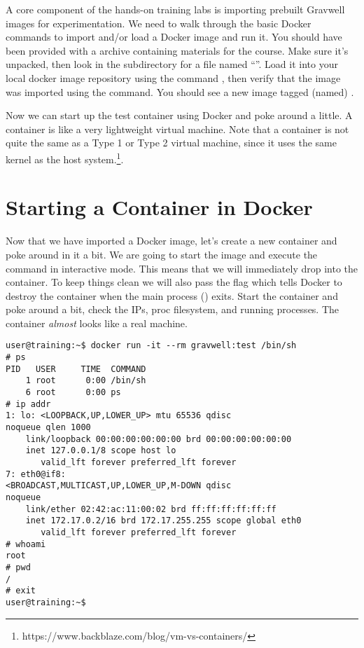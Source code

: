 A core component of the hands-on training labs is importing prebuilt
Gravwell images for experimentation. We need to walk through the basic
Docker commands to import and/or load a Docker image and run it. You
should have been provided with a  archive containing materials for
the course. Make sure it's unpacked, then look in the
 subdirectory for a file named ``''. Load it
into your local docker image repository using the command , then verify that the image was imported using the
 command. You should see a new image tagged (named) .

Now we can start up the test container using Docker and poke around a
little. A container is like a very lightweight virtual machine. Note that a
container is not quite the same as a Type 1 or Type 2 virtual machine,
since it uses the same kernel as the host system.\footnote{https://www.backblaze.com/blog/vm-vs-containers/}.

\section{Starting a Container in Docker}

Now that we have imported a Docker image, let's create a new container
and poke around in it a bit. We are going to start the
 image and execute the  command in
interactive mode. This means that we will immediately drop into the
container. To keep things clean we will also pass the
 flag which tells Docker to destroy the container when the
main process () exits. Start the container and poke around a
bit, check the IPs, proc filesystem, and running processes. The
container \emph{almost} looks like a real machine.

\begin{Verbatim}[breaklines=true]
user@training:~$ docker run -it --rm gravwell:test /bin/sh
# ps
PID   USER     TIME  COMMAND
    1 root      0:00 /bin/sh
    6 root      0:00 ps
# ip addr
1: lo: <LOOPBACK,UP,LOWER_UP> mtu 65536 qdisc
noqueue qlen 1000
    link/loopback 00:00:00:00:00:00 brd 00:00:00:00:00:00
    inet 127.0.0.1/8 scope host lo
       valid_lft forever preferred_lft forever
7: eth0@if8:
<BROADCAST,MULTICAST,UP,LOWER_UP,M-DOWN qdisc
noqueue
    link/ether 02:42:ac:11:00:02 brd ff:ff:ff:ff:ff:ff
    inet 172.17.0.2/16 brd 172.17.255.255 scope global eth0
       valid_lft forever preferred_lft forever
# whoami
root
# pwd
/
# exit
user@training:~$
\end{Verbatim}

